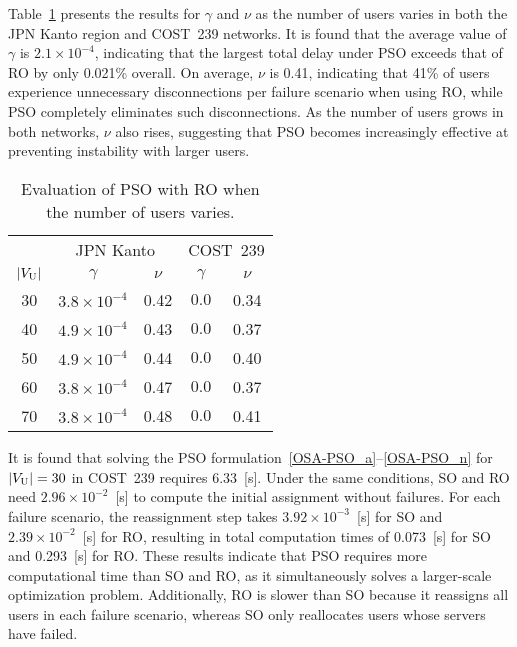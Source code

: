 \documentclass[10pt, letterpaper]{IEEEtran}
\begin{document}
\begin{CJK}{UTF8}{ipxm}
Table~\ref{tab:OSA-PSO_gamma_nu} presents the results for $\gamma$ and $\nu$ as the number of users varies in both the JPN Kanto region and COST~239 networks.
It is found that the average value of $\gamma$ is $2.1 \times 10^{-4}$, indicating that the largest total delay under PSO exceeds that of RO by only 0.021\% overall.
On average, $\nu$ is 0.41, indicating that 41\% of users experience unnecessary disconnections per failure scenario when using RO, while PSO completely eliminates such disconnections.
As the number of users grows in both networks, $\nu$ also rises, suggesting that PSO becomes increasingly effective at preventing instability with larger users.
\begin{table}[t]
  \caption{Evaluation of PSO with RO when the number of users varies.}
  \label{tab:OSA-PSO_gamma_nu}
  \begin{center}
    \begin{tabular}{c|cc|cc}
      \hline
      & \multicolumn{2}{c|}{JPN Kanto} & \multicolumn{2}{c}{COST~239} \\ \cline{2-5}
      $|V_{\rm{U}}|$ & $\gamma$ & $\nu$ & $\gamma$ & $\nu$ \\
      \hline
      30 & $3.8 \times 10^{-4}$ & 0.42 & $0.0$ & 0.34 \\
      40 & $4.9 \times 10^{-4}$ & 0.43 & $0.0$ & 0.37 \\
      50 & $4.9 \times 10^{-4}$ & 0.44 & $0.0$ & 0.40 \\
      60 & $3.8 \times 10^{-4}$ & 0.47 & $0.0$ & 0.37 \\
      70 & $3.8 \times 10^{-4}$ & 0.48 & $0.0$ & 0.41 \\
      \hline
    \end{tabular}
  \end{center}
\end{table}

It is found that solving the PSO formulation~\eqref{OSA-PSO_a}--\eqref{OSA-PSO_n} for $|V_{\rm U}|=30$ in COST~239 requires 6.33~[s].
Under the same conditions, SO and RO need $2.96 \times 10^{-2}$~[s] to compute the initial assignment without failures.
For each failure scenario, the reassignment step takes $3.92 \times 10^{-3}$~[s] for SO and $2.39 \times 10^{-2}$~[s] for RO, resulting in total computation times of 0.073~[s] for SO and 0.293~[s] for RO.
These results indicate that PSO requires more computational time than SO and RO, as it simultaneously solves a larger-scale optimization problem.
Additionally, RO is slower than SO because it reassigns all users in each failure scenario, whereas SO only reallocates users whose servers have failed.


\end{CJK}
\end{document}
